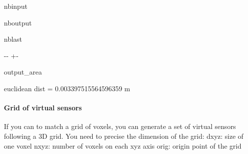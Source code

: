 \documentclass[letterpaper,10pt,english]{sphinxmanual}
\begin{document}
\begin{sphinxuseclass}{nbinput}
{
\begin{sphinxVerbatim}[commandchars=\\\{\}]
\llap{\color{nbsphinxin}[4]:\,\hspace{\fboxrule}\hspace{\fboxsep}}  \PYG{p}{[}       \PYG{p}{]}  
\end{sphinxVerbatim}
}

\end{sphinxuseclass}
\begin{sphinxuseclass}{nboutput}
\begin{sphinxuseclass}{nblast}
{

\kern-\sphinxverbatimsmallskipamount\kern-\baselineskip
\kern+\FrameHeightAdjust\kern-\fboxrule
\vspace{\nbsphinxcodecellspacing}

\begin{sphinxuseclass}{output_area}
\begin{sphinxuseclass}{}


\begin{sphinxVerbatim}[commandchars=\\\{\}]
euclidean dist =  0.003397515564596359  m
\end{sphinxVerbatim}



\end{sphinxuseclass}
\end{sphinxuseclass}
}

\end{sphinxuseclass}
\end{sphinxuseclass}

\paragraph{Grid of virtual sensors}
\label{\detokenize{lightmodels_functionnalities:Grid-of-virtual-sensors}}
\sphinxAtStartPar
If you can to match a grid of voxels, you can generate a set of virtual sensors following a 3D grid. You need to precise the dimension of the grid: \sphinxhyphen{} dxyz: \sphinxcode{\sphinxupquote{{[}dx, dy, dz{]}}} size of one voxel \sphinxhyphen{} nxyz: \sphinxcode{\sphinxupquote{{[}nx, ny, nz{]}}} number of voxels on each xyz axis \sphinxhyphen{} orig: \sphinxcode{\sphinxupquote{{[}0x, 0y, 0z{]}}} origin point of the grid
\end{document}
